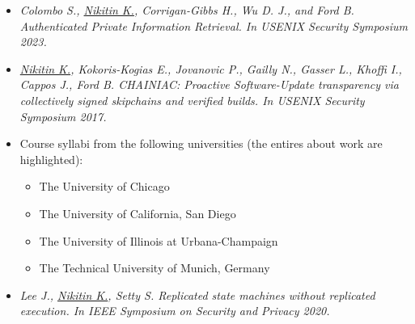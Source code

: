 \vspace{-7em}
\begin{itemize}
	\item \textit{Colombo S., \underline{Nikitin K.}, Corrigan-Gibbs H., Wu
	D. J., and Ford B. Authenticated Private Information Retrieval. In USENIX
	Security Symposium 2023.}
\end{itemize}

\begin{itemize}
	\item \textit{\underline{Nikitin K.}, Kokoris-Kogias E., Jovanovic P.,
	Gailly N., Gasser L., Khoffi I., Cappos J., Ford B. {CHAINIAC}: Proactive
	{Software-Update} transparency via collectively signed skipchains and
	verified builds. In USENIX Security Symposium 2017.}
	\item Course syllabi from the following universities (the entires about \drs work are
	highlighted):
	\begin{itemize}
		\item The University of Chicago
		\item The University of California, San Diego
		\item The University of Illinois at Urbana-Champaign
		\item The Technical University of Munich, Germany
	\end{itemize}
\end{itemize}

\vspace{-7em}
\begin{itemize}
	\item \textit{Lee J., \underline{Nikitin K.}, Setty S. Replicated state
	machines without replicated execution. In {IEEE} Symposium on Security and
	Privacy 2020.}
\end{itemize}

